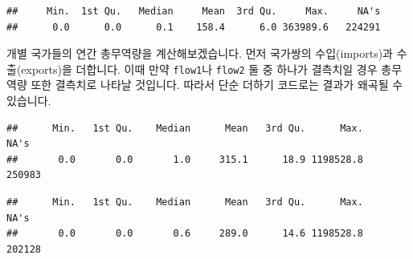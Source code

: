 \documentclass[]{book}
\newenvironment{Shaded}{\begin{snugshade}}{\end{snugshade}}
\newcommand{\CommentTok}[1]{\textcolor[rgb]{0.56,0.35,0.01}{\textit{#1}}}
\newcommand{\KeywordTok}[1]{\textcolor[rgb]{0.13,0.29,0.53}{\textbf{#1}}}
\newcommand{\NormalTok}[1]{#1}
\newcommand{\OperatorTok}[1]{\textcolor[rgb]{0.81,0.36,0.00}{\textbf{#1}}}
\newcommand{\StringTok}[1]{\textcolor[rgb]{0.31,0.60,0.02}{#1}}
\begin{document}
\begin{verbatim}
##     Min.  1st Qu.   Median     Mean  3rd Qu.     Max.     NA's 
##      0.0      0.0      0.1    158.4      6.0 363989.6   224291
\end{verbatim}

개별 국가들의 연간 총무역량을 계산해보겠습니다. 먼저 국가쌍의 수입(imports)과 수출(exports)을 더합니다. 이때 만약 \texttt{flow1}나 \texttt{flow2} 둘 중 하나가 결측치일 경우 총무역량 또한 결측치로 나타날 것입니다. 따라서 단순 더하기 코드로는 결과가 왜곡될 수 있습니다.

\begin{Shaded}
\end{Shaded}

\begin{verbatim}
##      Min.   1st Qu.    Median      Mean   3rd Qu.      Max.      NA's 
##       0.0       0.0       1.0     315.1      18.9 1198528.8    250983
\end{verbatim}

\begin{Shaded}
\end{Shaded}

\begin{verbatim}
##      Min.   1st Qu.    Median      Mean   3rd Qu.      Max.      NA's 
##       0.0       0.0       0.6     289.0      14.6 1198528.8    202128
\end{verbatim}
\end{document}
